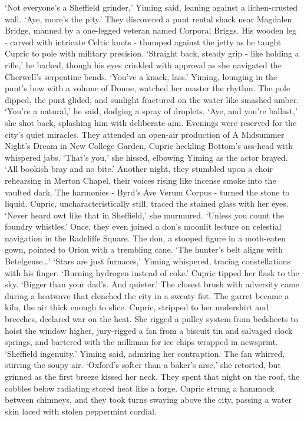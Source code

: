 `Not everyone's a Sheffield grinder,' Yiming said, leaning against a lichen-crusted wall.
`Aye, more's the pity.'
They discovered a punt rental shack near Magdalen Bridge, manned by a one-legged veteran named Corporal Briggs. His wooden leg - carved with intricate Celtic knots - thumped against the jetty as he taught Cupric to pole with military precision.
`Straight back, steady grip - like holding a rifle,' he barked, though his eyes crinkled with approval as she navigated the Cherwell's serpentine bends. `You've a knack, lass.'
Yiming, lounging in the punt's bow with a volume of Donne, watched her master the rhythm. The pole dipped, the punt glided, and sunlight fractured on the water like smashed amber. `You're a natural,' he said, dodging a spray of droplets.
`Aye, and you're ballast,' she shot back, splashing him with deliberate aim.
Evenings were reserved for the city's quiet miracles. They attended an open-air production of A Midsummer Night's Dream in New College Garden, Cupric heckling Bottom's ass-head with whispered jabs. `That's you,' she hissed, elbowing Yiming as the actor brayed. `All bookish bray and no bite.'
Another night, they stumbled upon a choir rehearsing in Merton Chapel, their voices rising like incense smoke into the vaulted dark. The harmonies - Byrd's Ave Verum Corpus - turned the stone to liquid. Cupric, uncharacteristically still, traced the stained glass with her eyes. `Never heard owt like that in Sheffield,' she murmured. `Unless you count the foundry whistles.'
Once, they even joined a don's moonlit lecture on celestial navigation in the Radcliffe Square. The don, a stooped figure in a moth-eaten gown, pointed to Orion with a trembling cane. `The hunter's belt aligns with Betelgeuse…'
`Stars are just furnaces,' Yiming whispered, tracing constellations with his finger. `Burning hydrogen instead of coke.'
Cupric tipped her flask to the sky. `Bigger than your dad's. And quieter.'
The closest brush with adversity came during a heatwave that clenched the city in a sweaty fist. The garret became a kiln, the air thick enough to slice. Cupric, stripped to her undershirt and breeches, declared war on the heat. She rigged a pulley system from bedsheets to hoist the window higher, jury-rigged a fan from a biscuit tin and salvaged clock springs, and bartered with the milkman for ice chips wrapped in newsprint.
`Sheffield ingenuity,' Yiming said, admiring her contraption. The fan whirred, stirring the soupy air.
`Oxford's softer than a baker's arse,' she retorted, but grinned as the first breeze kissed her neck.
They spent that night on the roof, the cobbles below radiating stored heat like a forge. Cupric strung a hammock between chimneys, and they took turns swaying above the city, passing a water skin laced with stolen peppermint cordial.
